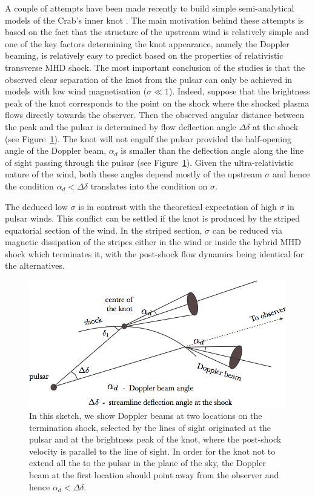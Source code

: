 A couple of attempts have been made recently to build simple semi-analytical models of the Crab’s inner knot \citep{YB-15,LKP-16}. The main motivation behind these attempts is based on the fact that the structure of the upstream wind is relatively simple and one of the key factors determining the knot appearance, namely the Doppler beaming, is relatively easy to predict based on the properties of relativistic transverse MHD shock.  The most important conclusion of the studies is that the observed clear separation of the knot from the pulsar can only be achieved in models with low wind magnetisation ($\sigma \ll 1$).   
Indeed, suppose that the brightness peak of the knot corresponds to the point on the shock where the shocked plasma 
flows directly towards the observer. Then the observed angular distance between the peak and the pulsar is determined 
by flow deflection angle $\Delta\delta$ at the shock (see Figure~\ref{knot-separation}). The knot will not engulf the pulsar provided the half-opening angle of the Doppler beam, $\alpha_d$ is smaller than the deflection angle along the line of sight passing through the pulsar (see Figure~\ref{knot-separation}). Given the ultra-relativistic nature of the wind, both these angles depend mostly of the upstream $\sigma$ and hence the condition $\alpha_d < \Delta\delta$ translates into the condition on $\sigma$.    

The deduced low $\sigma$ is in contrast with the theoretical expectation of high $\sigma$ in pulsar winds. This conflict can be settled if the knot is produced by the striped equatorial section of the wind. In the striped section, $\sigma$ can be reduced via
magnetic dissipation of the stripes either in the wind or inside the hybrid MHD shock which terminates it, with the post-shock flow dynamics being identical for the alternatives.  


\begin{figure}[h!]
\begin{center}
\includegraphics[width=0.7\columnwidth]{figures/f1/f1}
\caption{In this sketch, we show Doppler beams at two locations on the termination shock, selected by the lines of sight originated at the pulsar and  at the brightness peak of the knot, where the post-shock velocity is parallel to the line of sight.  
In order for the knot not to extend all the to the pulsar in the plane of the sky,  the Doppler beam at the first location should point away from the observer and hence $\alpha_d < \Delta\delta$.  
}
\end{center}
\label{knot-separation}
\end{figure}

